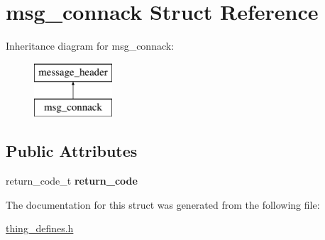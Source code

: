 \hypertarget{structmsg__connack}{\section{msg\-\_\-connack Struct Reference}
\label{structmsg__connack}
}
Inheritance diagram for msg\-\_\-connack\-:\begin{figure}[H]
\begin{center}
\leavevmode
\includegraphics[height=2.000000cm]{structmsg__connack}
\end{center}
\end{figure}
\subsection*{Public Attributes}
\begin{DoxyCompactItemize}
\item 
\hypertarget{structmsg__connack_ac8771823991ca3e61b7c44d63dd4a124}{return\-\_\-code\-\_\-t {\bfseries return\-\_\-code}}\label{structmsg__connack_ac8771823991ca3e61b7c44d63dd4a124}

\end{DoxyCompactItemize}


The documentation for this struct was generated from the following file\-:\begin{DoxyCompactItemize}
\item 
\hyperlink{thing__defines_8h}{thing\-\_\-defines.\-h}\end{DoxyCompactItemize}
